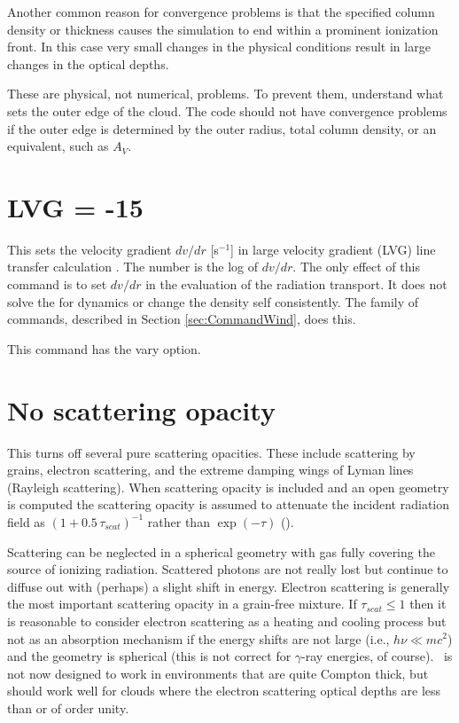 Another common reason for convergence problems is that
the specified column density or thickness causes the simulation to end
within a prominent ionization front.
In this case very small changes in the
physical conditions result in large changes in the optical depths.  

These
are physical, not numerical, problems.
To prevent them, understand what sets the outer edge of the cloud. 
The code should not have convergence
problems if the outer edge is determined by the outer radius, total column density,
or an equivalent, such as $A_V$.


\section{LVG = -15}
\label{sec:CommandLVG}

This sets the velocity gradient ${dv} / {dr}$ [s$^{-1}$] in large velocity gradient (LVG) line transfer calculation
\citep{CastorAbbotKlein75}. 
The number is the log of ${dv} / {dr}$.
The only effect of this command is to set ${dv} / {dr}$ in the evaluation of the radiation transport.
It does not solve the for dynamics or change the density self consistently.
The  family of commands, described in 
Section \ref{sec:CommandWind}, does this.

This command has the vary option.


\section{No scattering opacity}
\label{sec:CommandNoScatteringOpacity}

This turns off several pure scattering opacities.  These include
scattering by grains, electron scattering, and the extreme damping wings
of Lyman lines (Rayleigh scattering).
When scattering opacity is included
and an open geometry is computed the scattering opacity is assumed to
attenuate the incident radiation field as
$\left( {1 + 0.5\,\tau _{scat} } \right)^{ - 1} $
rather than $\exp \left( { - \tau } \right)$ (\citealp{Schuster1905}).

Scattering can be neglected in a spherical geometry with gas fully
covering the source of ionizing radiation.
Scattered photons are not really
lost but continue to diffuse out with (perhaps) a slight shift in energy.
Electron scattering is generally the most important scattering opacity in
a grain-free mixture.
If $ \tau _{scat}  \le 1$
then it is reasonable to consider electron scattering as a heating and
cooling process but not as an absorption mechanism if the energy shifts
are not large (i.e., $ h\nu \ll mc^2$) and the geometry is spherical
(this is not correct for $\gamma$-ray energies,
of course).
\Cloudy\ is not now designed to work in environments that are
quite Compton thick, but should work well for clouds where the electron
scattering optical depths are less than or of order unity.

